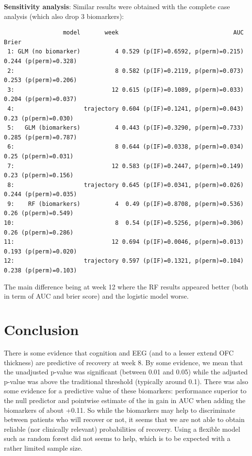 \documentclass[12pt]{article}
\begin{document}
\bigskip

\textbf{Sensitivity analysis}: Similar results were obtained with the
complete case analysis (which also drop 3 biomarkers):
\begin{verbatim}
                 model       week                                 AUC                 Brier
 1: GLM (no biomarker)          4 0.529 (p(IF)=0.6592, p(perm)=0.215) 0.244 (p(perm)=0.328)
 2:                             8 0.582 (p(IF)=0.2119, p(perm)=0.073) 0.253 (p(perm)=0.206)
 3:                            12 0.615 (p(IF)=0.1089, p(perm)=0.033) 0.204 (p(perm)=0.037)
 4:                    trajectory 0.604 (p(IF)=0.1241, p(perm)=0.043)  0.23 (p(perm)=0.030)
 5:   GLM (biomarkers)          4 0.443 (p(IF)=0.3290, p(perm)=0.733) 0.285 (p(perm)=0.787)
 6:                             8 0.644 (p(IF)=0.0338, p(perm)=0.034)  0.25 (p(perm)=0.031)
 7:                            12 0.583 (p(IF)=0.2447, p(perm)=0.149)  0.23 (p(perm)=0.156)
 8:                    trajectory 0.645 (p(IF)=0.0341, p(perm)=0.026) 0.244 (p(perm)=0.035)
 9:    RF (biomarkers)          4  0.49 (p(IF)=0.8708, p(perm)=0.536)  0.26 (p(perm)=0.549)
10:                             8  0.54 (p(IF)=0.5256, p(perm)=0.306)  0.26 (p(perm)=0.286)
11:                            12 0.694 (p(IF)=0.0046, p(perm)=0.013) 0.193 (p(perm)=0.020)
12:                    trajectory 0.597 (p(IF)=0.1321, p(perm)=0.104) 0.238 (p(perm)=0.103)
\end{verbatim}

The main difference being at week 12 where the RF results appeared
better (both in term of AUC and brier score) and the logistic model
worse.

\clearpage

\section{Conclusion}
\label{sec:org51b26dd}

There is some evidence that cognition and EEG (and to a lesser extend
OFC thickness) are predictive of recovery at week 8. By some evidence,
we mean that the unadjusted p-value was significant (between 0.01 and
0.05) while the adjusted p-value was above the traditional threshold
(typically around 0.1). There was also some evidence for a predictive
value of these biomarkers: performance superior to the null predictor
and pointwise estimate of the in gain in AUC when adding the
biomarkers of about +0.11. So while the biomarkers may help to
discriminate between patients who will recover or not, it seems that
we are not able to obtain reliable (nor clinically relevant)
probabilities of recovery. \newline Using a flexible model such as
random forest did not seems to help, which is to be expected with a
rather limited sample size.
\end{document}
